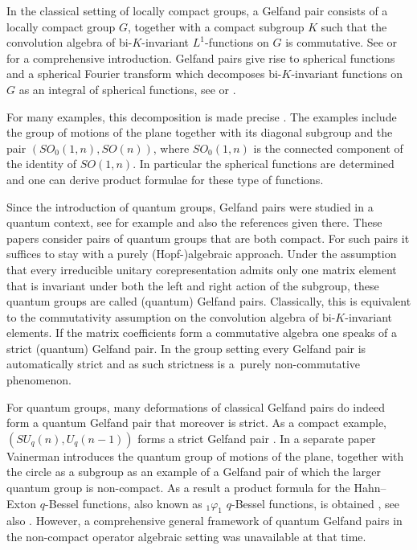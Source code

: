 \documentclass[pdftex]{sigma}
\numberwithin{equation}{section}
\theoremstyle{definition}
\begin{document}
In the classical setting of locally compact groups, a Gelfand pair consists of a locally compact group $G$, together with a compact subgroup $K$ such that the convolution algebra of bi-$K$-invariant $L^1$-functions on $G$ is commutative. See \cite{Dij} or \cite{Far} for a comprehensive introduction. Gelfand pairs give rise to spherical functions and a spherical Fourier transform which decomposes bi-$K$-invariant functions on $G$ as an integral of spherical functions, see \cite[Theorem 6.4.5]{Dij} or \cite[Th\'eor\`eme IV.2]{Far}.

For many examples, this decomposition is made precise \cite{Dij}. The examples include the group of motions of the plane together with its diagonal subgroup and the pair $(SO_0(1,n), SO(n))$, where $SO_0(1,n)$ is the connected component of the identity of $SO(1,n)$. In particular the spherical functions are determined and one can derive product formulae for these type of functions.

Since the introduction of quantum groups, Gelfand pairs were studied in a quantum context, see for example \cite{Flo, PodVai, VaiGel, VaiHyp} and also the references given there. These papers  consider  pairs of quantum groups that are both compact. For such pairs it suf\/f\/ices to stay with a purely \mbox{(Hopf-)}al\-gebraic approach. Under the assumption that every irreducible unitary corepresentation admits only one matrix element that is invariant under both the left and right action of the subgroup, these quantum groups are called (quantum) Gelfand pairs. Classically, this is equiva\-lent to the commutativity assumption on the convolution algebra of bi-$K$-invariant elements. If the matrix coef\/f\/icients form a commutative algebra one speaks of a strict (quantum) Gelfand pair. In the group setting every Gelfand pair is automatically strict and as such strictness is a~purely non-commutative phenomenon.

For quantum groups, many deformations of classical Gelfand pairs do indeed form a quantum Gelfand pair that moreover is strict. As a compact example, $(SU_q(n), U_q(n-1))$ forms a strict Gelfand pair \cite{VaiHyp}. In a separate paper \cite{VaiE2} Vainerman introduces the quantum group of motions of the plane, together with the circle as a subgroup as an example of a Gelfand pair of which the larger quantum group is non-compact.  As a result a product formula for the Hahn--Exton $q$-Bessel functions, also known as $_1\varphi_1$ $q$-Bessel functions, is obtained \cite[ Corollary, p.~324]{VaiE2}, see also \cite[Corollary~6.4]{Koe}. However, a comprehensive general framework of quantum Gelfand pairs in the non-compact operator algebraic setting was unavailable at that time.
\end{document}
